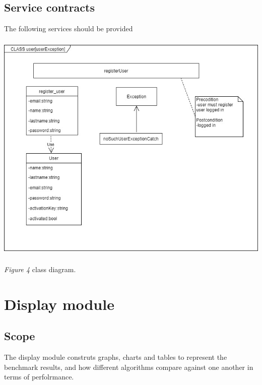 \documentclass[runningheads,a4paper]{article}
\begin{document}
\subsection{\textbf{Service contracts}}
The following services should be provided
\newline
\newline
\includegraphics[width=15cm , height=12cm]{../Images/userConstract.jpg}
\newline 
\textit{Figure 4} class diagram.

\section{Display module}
\subsection{Scope}
The display module construts graphs, charts and tables to represent the benchmark results, and how different algorithms 
compare against one another in terms of perfolrmance.
\end{document}
